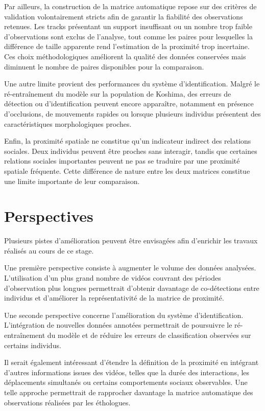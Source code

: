 \documentclass[11pt,a4paper]{report}
\begin{document}
Par ailleurs, la construction de la matrice automatique repose sur des
critères de validation volontairement stricts afin de garantir la
fiabilité des observations retenues. Les tracks présentant un support
insuffisant ou un nombre trop faible d'observations sont exclus de
l'analyse, tout comme les paires pour lesquelles la différence de taille
apparente rend l'estimation de la proximité trop incertaine. Ces choix
méthodologiques améliorent la qualité des données conservées mais
diminuent le nombre de paires disponibles pour la comparaison.

Une autre limite provient des performances du système d'identification.
Malgré le ré-entraînement du modèle sur la population de Koshima, des
erreurs de détection ou d'identification peuvent encore apparaître,
notamment en présence d'occlusions, de mouvements rapides ou lorsque
plusieurs individus présentent des caractéristiques morphologiques
proches.

Enfin, la proximité spatiale ne constitue qu'un indicateur indirect des
relations sociales. Deux individus peuvent être proches sans interagir,
tandis que certaines relations sociales importantes peuvent ne pas se
traduire par une proximité spatiale fréquente. Cette différence de nature
entre les deux matrices constitue une limite importante de leur
comparaison.

\section{Perspectives}

Plusieurs pistes d'amélioration peuvent être envisagées afin d'enrichir
les travaux réalisés au cours de ce stage.

Une première perspective consiste à augmenter le volume des données
analysées. L'utilisation d'un plus grand nombre de vidéos couvrant des
périodes d'observation plus longues permettrait d'obtenir davantage de
co-détections entre individus et d'améliorer la représentativité de la
matrice de proximité.

Une seconde perspective concerne l'amélioration du système
d'identification. L'intégration de nouvelles données annotées permettrait
de poursuivre le ré-entraînement du modèle et de réduire les erreurs de
classification observées sur certains individus.

Il serait également intéressant d'étendre la définition de la proximité
en intégrant d'autres informations issues des vidéos, telles que la
durée des interactions, les déplacements simultanés ou certains
comportements sociaux observables. Une telle approche permettrait de
rapprocher davantage la matrice automatique des observations réalisées
par les éthologues.
\end{document}
